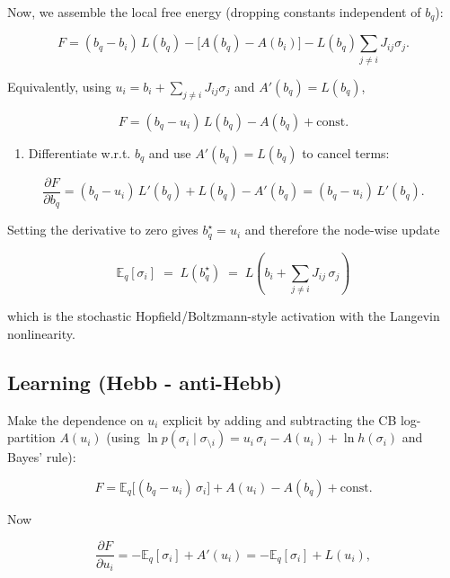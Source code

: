 \documentclass{article}
\begin{document}
Now, we assemble the local free energy (dropping constants independent of $b_q$):

\begin{equation}
F = (b_q - b_i)\,L(b_q) - \big[A(b_q)-A(b_i)\big] - L(b_q)\sum_{j\ne i}J_{ij}\sigma_j.
\end{equation}

Equivalently, using $u_i=b_i+\sum_{j\ne i}J_{ij}\sigma_j$ and $A'(b_q)=L(b_q)$,

\begin{equation}
F = (b_q - u_i)\,L(b_q) - A(b_q) + \text{const}.
\end{equation}

\begin{enumerate}[resume]
\item Differentiate w.r.t. $b_q$ and use $A'(b_q)=L(b_q)$ to cancel terms:
\end{enumerate}

\begin{equation}
\frac{\partial F}{\partial b_q} = (b_q-u_i)\,L'(b_q) + L(b_q) - A'(b_q) = (b_q-u_i)\,L'(b_q).
\end{equation}

Setting the derivative to zero gives $b_q^\star=u_i$ and therefore the node-wise update

\begin{equation}
\boxed{\;\mathbb{E}_q[\sigma_i] \;=\; L(b_q^\star) \;=\; L\!\left(b_i + \sum_{j\ne i} J_{ij}\,\sigma_j\right)\;}
\end{equation}

which is the stochastic Hopfield/Boltzmann-style activation with the Langevin nonlinearity.

\subsection{Learning (Hebb - anti-Hebb)}

Make the dependence on $u_i$ explicit by adding and subtracting the CB log-partition $A(u_i)$ (using $\ln p(\sigma_i\mid\sigma_{\setminus i})=u_i\,\sigma_i - A(u_i)+\ln h(\sigma_i)$ and Bayes' rule):

\begin{equation}
F = \mathbb{E}_q\big[(b_q-u_i)\,\sigma_i\big] + A(u_i) - A(b_q) + \text{const}.
\end{equation}

Now

\begin{equation}
\frac{\partial F}{\partial u_i} = -\mathbb{E}_q[\sigma_i] + A'(u_i) = -\mathbb{E}_q[\sigma_i] + L(u_i),
\end{equation}
\end{document}
